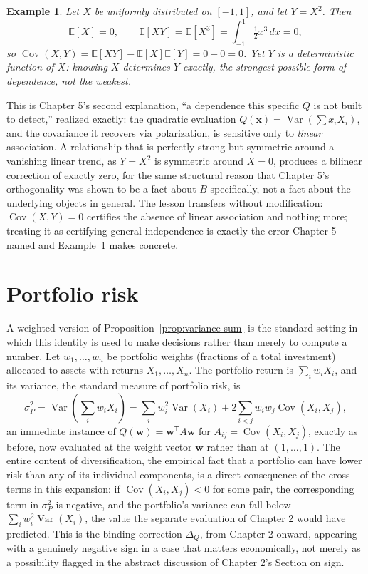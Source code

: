 \documentclass[11pt]{book}
\newtheorem{example}[theorem]{Example}
\begin{document}
\begin{example}
\label{ex:parabola}
Let $X$ be uniformly distributed on $[-1,1]$, and let $Y=X^2$. Then
\[
\mathbb E[X] = 0, \qquad \mathbb E[XY] = \mathbb E[X^3] = \int_{-1}^1 \tfrac12 x^3\,dx = 0,
\]
so $\operatorname{Cov}(X,Y)=\mathbb E[XY]-\mathbb E[X]\mathbb E[Y]=0-0=0$. Yet $Y$ is a deterministic function of $X$: knowing $X$ determines $Y$ exactly, the strongest possible form of dependence, not the weakest.
\end{example}

This is Chapter 5's second explanation, ``a dependence this specific $Q$ is not built to detect,'' realized exactly: the quadratic evaluation $Q(\mathbf{x})=\operatorname{Var}(\sum x_iX_i)$, and the covariance it recovers via polarization, is sensitive only to \emph{linear} association. A relationship that is perfectly strong but symmetric around a vanishing linear trend, as $Y=X^2$ is symmetric around $X=0$, produces a bilinear correction of exactly zero, for the same structural reason that Chapter 5's orthogonality was shown to be a fact about $B$ specifically, not a fact about the underlying objects in general. The lesson transfers without modification: $\operatorname{Cov}(X,Y)=0$ certifies the absence of linear association and nothing more; treating it as certifying general independence is exactly the error Chapter 5 named and Example~\ref{ex:parabola} makes concrete.

\section{Portfolio risk}

A weighted version of Proposition~\ref{prop:variance-sum} is the standard setting in which this identity is used to make decisions rather than merely to compute a number. Let $w_1,\ldots,w_n$ be portfolio weights (fractions of a total investment) allocated to assets with returns $X_1,\ldots,X_n$. The portfolio return is $\sum_i w_iX_i$, and its variance, the standard measure of portfolio risk, is
\[
\sigma_P^2 = \operatorname{Var}\!\left(\sum_i w_iX_i\right) = \sum_i w_i^2\operatorname{Var}(X_i) + 2\sum_{i<j}w_iw_j\operatorname{Cov}(X_i,X_j),
\]
an immediate instance of $Q(\mathbf{w})=\mathbf{w}^{\mathsf T}A\mathbf{w}$ for $A_{ij}=\operatorname{Cov}(X_i,X_j)$, exactly as before, now evaluated at the weight vector $\mathbf{w}$ rather than at $(1,\ldots,1)$. The entire content of diversification, the empirical fact that a portfolio can have lower risk than any of its individual components, is a direct consequence of the cross-terms in this expansion: if $\operatorname{Cov}(X_i,X_j)<0$ for some pair, the corresponding term in $\sigma_P^2$ is negative, and the portfolio's variance can fall below $\sum_i w_i^2\operatorname{Var}(X_i)$, the value the separate evaluation of Chapter 2 would have predicted. This is the binding correction $\Delta_Q$, from Chapter 2 onward, appearing with a genuinely negative sign in a case that matters economically, not merely as a possibility flagged in the abstract discussion of Chapter 2's Section on sign.
\end{document}
